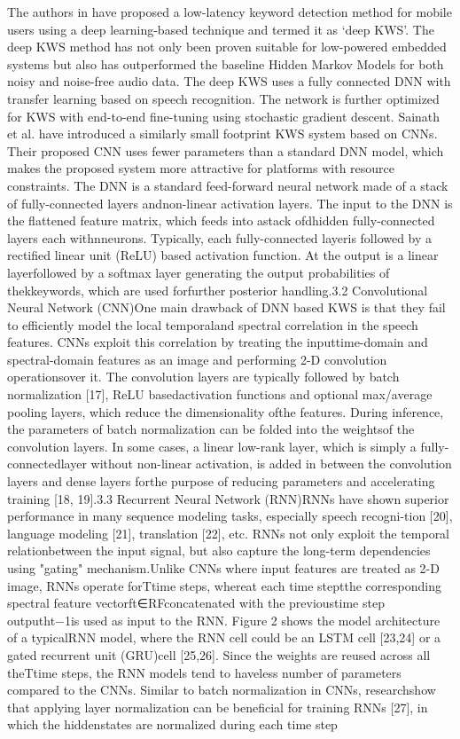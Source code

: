 The authors in \cite{chen2014small} have proposed a low-latency keyword detection method for mobile users using a deep learning-based technique and termed it as ‘deep KWS’. The deep KWS method has not only been proven suitable for low-powered embedded systems but also has outperformed the baseline Hidden Markov Models for both noisy and noise-free audio data. The deep KWS uses a fully connected DNN with transfer learning  based on speech recognition. The network is further optimized for KWS with end-to-end fine-tuning using stochastic gradient descent. Sainath et al. \cite{sainath2015convolutional} have introduced a similarly small footprint KWS system based on CNNs. Their proposed CNN uses fewer parameters than a standard DNN model, which makes the proposed system more attractive for platforms with resource constraints. 
The DNN is a standard feed-forward neural network made of a stack of fully-connected layers andnon-linear activation layers. The input to the DNN is the flattened feature matrix, which feeds into astack ofdhidden fully-connected layers each withnneurons. Typically, each fully-connected layeris followed by a rectified linear unit (ReLU) based activation function. At the output is a linear layerfollowed by a softmax layer generating the output probabilities of thekkeywords, which are used forfurther posterior handling.3.2  Convolutional Neural Network (CNN)One main drawback of DNN based KWS is that they fail to efficiently model the local temporaland spectral correlation in the speech features. CNNs exploit this correlation by treating the inputtime-domain and spectral-domain features as an image and performing 2-D convolution operationsover it.  The convolution layers are typically followed by batch normalization [17], ReLU basedactivation functions and optional max/average pooling layers, which reduce the dimensionality ofthe features. During inference, the parameters of batch normalization can be folded into the weightsof the convolution layers. In some cases, a linear low-rank layer, which is simply a fully-connectedlayer without non-linear activation, is added in between the convolution layers and dense layers forthe purpose of reducing parameters and accelerating training  [18, 19].3.3  Recurrent Neural Network (RNN)RNNs have shown superior performance in many sequence modeling tasks, especially speech recogni-tion [20], language modeling  [21], translation [22], etc. RNNs not only exploit the temporal relationbetween the input signal, but also capture the long-term dependencies using "gating" mechanism.Unlike CNNs where input features are treated as 2-D image, RNNs operate forTtime steps, whereat each time steptthe corresponding spectral feature vectorft∈RFconcatenated with the previoustime step outputht−1is used as input to the RNN. Figure 2 shows the model architecture of a typicalRNN model, where the RNN cell could be an LSTM cell [23,24] or a gated recurrent unit (GRU)cell [25,26]. Since the weights are reused across all theTtime steps, the RNN models tend to haveless number of parameters compared to the CNNs. Similar to batch normalization in CNNs, researchshow that applying layer normalization can be beneficial for training RNNs [27], in which the hiddenstates are normalized during each time step
